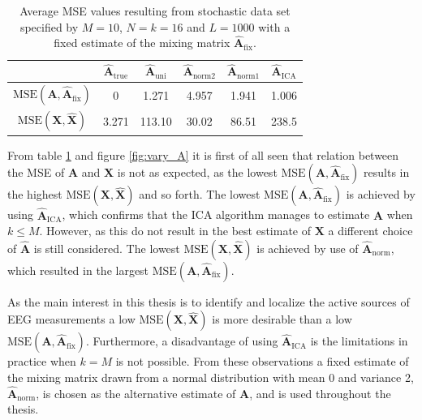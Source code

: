 \begin{table}[H]
\centering
\begin{tabular}{|c|c|c|c|c|c|}
\hline
 &  $\hat{\mathbf{A}}_{\text{true}}$ & $\hat{\mathbf{A}}_{\text{uni}}$ & $\hat{\mathbf{A}}_{\text{norm2}}$	 & $\hat{\mathbf{A}}_{\text{norm1}}$ & $\hat{\mathbf{A}}_{\text{ICA}}$ \\
\hline
$\text{MSE}(\mathbf{A}, \hat{\mathbf{A}}_{\text{fix}})$ & 0 & 1.271 & 4.957 & 1.941 & 1.006 \\
\hline
$\text{MSE}(\mathbf{X}, \hat{\mathbf{X}})$ & 3.271 & 113.10 & 30.02 & 86.51 & 238.5 \\
\hline
\end{tabular}
\caption{Average MSE values resulting from stochastic data set specified by $M=10$, $N=k=16$ and $L=1000$ with a fixed estimate of the mixing matrix $\hat{\mathbf{A}}_{\text{fix}}$.}
\label{tab:fixed}
\end{table}
\noindent
From table \ref{tab:fixed} and figure \ref{fig:vary_A} it is first of all seen that relation between the MSE of $\textbf{A}$ and $\textbf{X}$ is not as expected, as the lowest $\text{MSE}(\mathbf{A}, \hat{\mathbf{A}}_{\text{fix}})$ results in the highest $\text{MSE}(\mathbf{X}, \hat{\mathbf{X}})$ and so forth. 
The lowest $\text{MSE}(\mathbf{A}, \hat{\mathbf{A}}_{\text{fix}})$ is achieved by using $\hat{\mathbf{A}}_{\text{ICA}}$, which confirms that the ICA algorithm manages to estimate $\mathbf{A}$ when $k \leq M$. 
However, as this do not result in the best estimate of $\mathbf{X}$ a different choice of $\hat{\mathbf{A}}$ is still considered. 
The lowest $\text{MSE}(\mathbf{X}, \hat{\mathbf{X}})$ is achieved by use of $\hat{\mathbf{A}}_{\text{norm}}$, which resulted in the largest $\text{MSE}(\mathbf{A}, \hat{\mathbf{A}}_{\text{fix}})$. 
      
As the main interest in this thesis is to identify and localize the active sources of EEG measurements a low $\text{MSE}(\mathbf{X}, \hat{\mathbf{X}})$ is more desirable than a low $\text{MSE}(\mathbf{A}, \hat{\mathbf{A}}_{\text{fix}})$. 
Furthermore, a disadvantage of using $\hat{\mathbf{A}}_{\text{ICA}}$ is the limitations in practice when $k = M$ is not possible. 
From these observations a fixed estimate of the mixing matrix drawn from a normal distribution with mean 0 and variance 2, $\hat{\mathbf{A}}_{\text{norm}}$, is chosen as the alternative estimate of $\mathbf{A}$, and is used throughout the thesis. 

